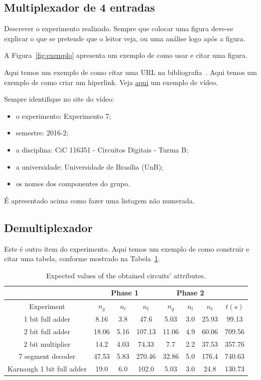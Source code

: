 \documentclass[12pt]{article}
\begin{document}
\subsection{Multiplexador de 4 entradas}
\label{sec:Mux}

Descrever o experimento realizado. Sempre  que colocar uma figura deve-se explicar o que se pretende que o leitor veja, ou uma análise logo após a figura. 


A Figura~\ref{fig:exemplo} apresenta um exemplo de como usar e citar uma figura.

Aqui temos um exemplo de como citar uma URL na bibliografia~\cite{systemverilog}.
Aqui temos um exemplo de como criar um hiperlink. Veja
\href{https://www.youtube.com/watch?v=EcNxjxKRQ6E}{aqui} um exemplo de vídeo.

Sempre identifique no site do vídeo:
\begin{itemize}
    \item o experimento: Experimento 7;
    \item semestre: 2016-2;
    \item a disciplina: CiC 116351 - Circuitos Digitais - Turma B;
    \item a universidade: Universidade de Brasília (UnB);
    \item os nomes dos componentes do grupo.
\end{itemize}

É apresentado acima como fazer uma listagem não numerada.

\subsection{Demultiplexador}
\label{sec:Demux}

Este é outro item do experimento.
Aqui temos um exemplo de como construir e citar uma tabela, conforme mostrado na Tabela~\ref{tab:resultados}.

\begin{table}[H]
    \centering
    \caption{Expected values of the obtained circuits' attributes.}
    \begin{tabular}{|c|c|c|c|c|c|c|c|}
    \cline{2-7}
    \multicolumn{1}{c}{} & \multicolumn{3}{|c|}{Phase 1} & \multicolumn{3}{c|}{Phase 2} & \multicolumn{1}{c}{} \\
    \hline
    Experiment & $n_g$ & $n_l$ & $n_t$ & $n_g$ & $n_l$ & $n_t$ & $t(s)$ \\
    \hline
    1 bit full adder & 8.16 & 3.8 & 47.6 & 5.03 & 3.0 & 25.93 & 99.13 \\
    2 bit full adder & 18.06 & 5.16 & 107.13 & 11.06 & 4.9 & 60.06 & 709.56 \\
    2 bit multiplier & 14.2 & 4.03 & 74.33 & 7.7 & 2.2 & 37.53 & 357.76 \\
    7 segment decoder & 47.53 & 5.83 & 270.46 & 32.86 & 5.0 & 176.4 & 740.63 \\
    Karnaugh 1 bit full adder & 19.0 & 6.0 & 102.0 & 5.03 & 3.0 & 24.8 & 130.73 \\
    \hline
    \end{tabular}
    \label{tab:resultados}
\end{table}
\end{document}

